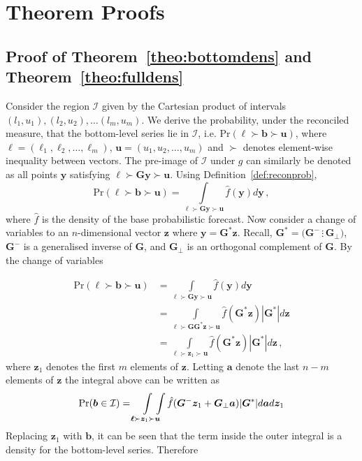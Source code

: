 \documentclass[a4paper,12pt]{article}
\theoremstyle{definition}
\begin{document}




\clearpage

\appendix

\section{Theorem Proofs} \label{app:proofs}

\subsection{Proof of Theorem~\ref{theo:bottomdens} and Theorem~\ref{theo:fulldens}} \label{app:Bottom&FullDens}

Consider the region $\mathcal{I}$ given by the Cartesian product of intervals $(l_1,u_1),(l_2,u_2),\ldots(l_m,u_m)$. We derive the probability, under the reconciled measure, that the bottom-level series lie in $\mathcal{I}$, i.e. $\mbox{Pr}(\bm{\ell}\succ\bm{b}\succ\bm{u})$, where $\bm{\ell}=(\ell_1,\ell_2,\ldots,\ell_m)$, $\bm{u}=(u_1,u_2,\ldots,u_m)$ and $\succ$ denotes element-wise inequality between vectors. The pre-image of $\mathcal{I}$ under $g$ can similarly be denoted as all points $\bm{y}$ satisfying $\bm{\ell}\succ\bm{G}\bm{y}\succ\bm{u}$. Using Definition~\ref{def:reconprob},
\[
\mbox{Pr}(\bm{\ell}\succ\bm{b}\succ\bm{u})=\int\limits_{\bm{\ell}\succ\bm{G}\bm{y}\succ\bm{u}}\hat{f}(\bm{y})d\bm{y}\,,
\]
where $\hat{f}$ is the density of the base probabilistic forecast. Now consider a change of variables to an $n$-dimensional vector $\bm{z}$ where $\bm{y}=\bm{G}^*\bm{z}$. Recall, $\bm{G}^*=\big(\bm{G}^{-}\,\vdots\,\bm{G}_\perp\big)$, $\bm{G}^{-}$ is a generalised inverse of $\bm{G}$, and $\bm{G}_\perp$ is an orthogonal complement of $\bm{G}$. By the change of variables

\begin{align}
\mbox{Pr}(\bm{\ell}\succ\bm{b}\succ\bm{u})&=\int\limits_{\bm{\ell}\succ\bm{G}\bm{y}\succ\bm{u}}\hat{f}(\bm{y})d\bm{y}\nonumber\\
&=\int\limits_{\bm{\ell}\succ\bm{G}\bm{G}^*\bm{z}\succ\bm{u}}\hat{f}(\bm{G}^*\bm{z})|\bm{G}^*|d\bm{z}\nonumber\\
&=\int\limits_{\bm{\ell}\succ\bm{z}_1\succ\bm{u}}\hat{f}(\bm{G}^*\bm{z})|\bm{G}^*|d\bm{z}\nonumber\,,
\end{align}
where $\bm{z}_1$ denotes the first $m$ elements of $\bm{z}$. Letting $\bm{a}$ denote the last $n-m$ elements of $\bm{z}$ the integral above can be written as
\[
\mbox{Pr}(\bm{b}\in \mathcal{I})=\int\limits_{\bm{\ell}\succ\bm{z}_1\succ\bm{u}}\!\!\!\!\!\int\hat{f}(\bm{G}^{-}\bm{z}_1+\bm{G}_{\perp}\bm{a})|\bm{G}^*|d\bm{a}d\bm{z}_1\nonumber\\
\]
Replacing $\bm{z}_1$ with $\bm{b}$, it can be seen that the term inside the outer integral is a density for the bottom-level series. Therefore
\end{document}
